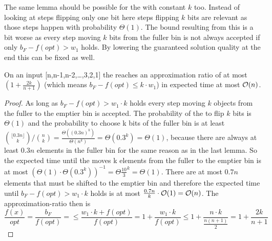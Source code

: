 The same lemma should be possible for the \RLSN[k] with constant $k$ too.
Instead of looking at steps flipping only one bit here steps flipping $k$ bits are relevant as those steps happen with probability $\Theta(1)$.
The bound resulting from this is a bit worse as every step moving $k$ bits from the fuller bin is not always accepted if only $b_F-f(opt)>w_1$ holds.
By lowering the guaranteed solution quality at the end this can be fixed as well.

\begin{lemma}
    On an input [n,n-1,n-2,\dots,3,2,1] the \RLSN[k] reaches an approximation ratio of at most $(1+\frac{2k}{n+1})$ (which means $b_F-f(opt)\le k\cdot w_1$) in expected time at most $\mathcal{O}(n)$.
\end{lemma}
\begin{proof}
    As long as $b_F-f(opt)>w_1\cdot k$ holds every step moving $k$ objects from the fuller to the emptier bin is accepted.
    The probability of the \RLSN[k] to flip $k$ bits is $\Theta(1)$ and the probability to choose k bits of the fuller bin is at least \(\binom{\lfloor 0.3n\rfloor}{k}/\binom{n}{k}=\frac{\Theta({(0.3n)}^k)}{\Theta(n^k)}=\Theta(0.3^k)=\Theta(1)\), because there are always at least $0.3n$ elements in the fuller bin for the same reason as in the last lemma.
    So the expected time until the \RLSN[k] moves k elements from the fuller to the emptier bin is at most \({(\Theta(1)\cdot\Theta(0.3^k))}^{-1}=\Theta{\frac{10}{3}}^k=\Theta(1)\).
    There are at most $0.7n$ elements that must be shifted to the emptier bin and therefore the expected time until $b_F-f(opt)>w_1\cdot k$ holds is at most $\frac{0.7n}{k}\cdot\mathcal{O}(1)=\mathcal{O}(n)$.
    The approximation-ratio then is 
    \[
        \frac{f(x)}{opt}
        =\frac{b_F}{f(opt)}
        =\le\frac{w_1\cdot k+f(opt)}{f(opt)}
        =1+\frac{w_1\cdot k}{f(opt)}
        \le1+\frac{n\cdot k}{\frac{n(n+1)}{2}}
        =1+\frac{2k}{n+1}
    \]
\end{proof}

